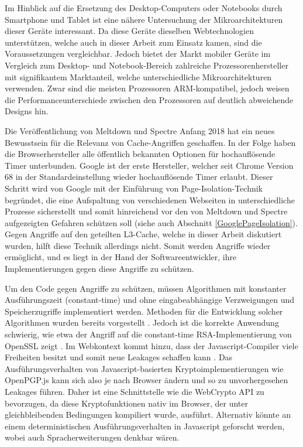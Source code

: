 Im Hinblick auf die Ersetzung des Desktop-Computers oder Notebooks durch Smartphone und Tablet ist eine nähere Untersuchung der Mikroarchitekturen dieser Geräte interessant.
Da diese Geräte dieselben Webtechnologien unterstützen, welche auch in dieser Arbeit zum Einsatz kamen, sind die Voraussetzungen vergleichbar.
Jedoch bietet der Markt mobiler Geräte im Vergleich zum Desktop- und Notebook-Bereich zahlreiche Prozessorenhersteller mit signifikantem Marktanteil, welche unterschiedliche Mikroarchitekturen verwenden.
Zwar sind die meisten Prozessoren ARM-kompatibel, jedoch weisen die Performanceunterschiede zwischen den Prozessoren \cite{GeekbenchMobile} auf deutlich abweichende Designs hin.


Die Veröffentlichung von Meltdown und Spectre Anfang 2018 hat ein neues Bewusstsein für die Relevanz von Cache-Angriffen geschaffen.
In der Folge haben die Browserhersteller alle öffentlich bekannten Optionen für hochauflösende Timer unterbunden.
Google ist der erste Hersteller, welcher seit Chrome Version 68 in der Standardeinstellung wieder hochauflösende Timer erlaubt.
Dieser Schritt wird von Google mit der Einführung von Page-Isolation-Technik \cite{ChromeSiteIsolation} begründet, die eine Aufspaltung von verschiedenen Webseiten in unterschiedliche Prozesse sicherstellt und somit hinreichend vor den von Meltdown und Spectre aufgezeigten Gefahren schützen soll (siehe auch Abschnitt \ref{GooglePageIsolation}).
Gegen Angriffe auf den geteilten L3-Cache, welche in dieser Arbeit diskutiert wurden, hilft diese Technik allerdings nicht.
Somit werden Angriffe wieder ermöglicht, und es liegt in der Hand der Softwareentwickler, ihre Implementierungen gegen diese Angriffe zu schützen.

Um den Code gegen Angriffe zu schützen, müssen Algorithmen mit konstanter Ausführungszeit (constant-time) und ohne eingabeabhängige Verzweigungen und Speicherzugriffe implementiert werden.
Methoden für die Entwicklung solcher Algorithmen wurden bereits vorgestellt \cite{ConstTimeAlgorithm}.
Jedoch ist die korrekte Anwendung schwierig, wie etwa der Angriff auf die constant-time RSA-Implementierung von OpenSSL zeigt \cite{CacheBleed}.
Im Webkontext kommt hinzu, dass der Javascript-Compiler viele Freiheiten besitzt und somit neue Leakages schaffen kann \cite{DriveByPaper}.
Das Ausführungsverhalten von Javascript-basierten Kryptoimplementierungen wie OpenPGP.js kann sich also je nach Browser ändern und so zu unvorhergesehen Leakages führen.
Daher ist eine Schnittstelle wie die WebCrypto API \cite{WebCryptoAPI} zu bevorzugen, da diese Kryptofunktionen nativ im Browser, der unter gleichbleibenden Bedingungen kompiliert wurde, ausführt.
Alternativ könnte an einem deterministischen Ausführungsverhalten in Javascript geforscht werden, wobei auch Spracherweiterungen denkbar wären.

